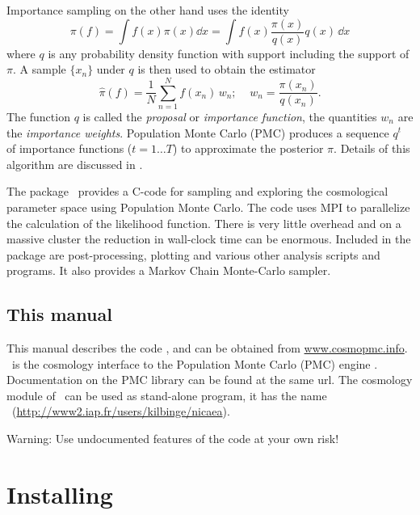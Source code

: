 \documentclass[11pt, chapterprefix, headsepline]{scrartcl}
\begin{document}
Importance sampling on the other
hand uses the identity
%
\begin{equation}
  \pi(f) = \int f(x) \pi(x) \dd x = \int f(x) \frac{\pi(x)}{q(x)} q(x) \,
  \dd x
\end{equation}
%
where $q$ is any probability density function with support including
the support of $\pi$.
A sample $\{x_n\}$ under $q$ is then
used to obtain the estimator
%
\begin{equation}
  \hat \pi (f) = \frac 1 N \sum_{n=1}^N f(x_n) \, w_n; \;\;\;\; w_n =
  \frac{\pi(x_n)}{q(x_n)}.
  \label{eq:importance_weight}
\end{equation}
%
The function $q$ is called the \textit{proposal} or \textit{importance
  function}, the quantities $w_n$ are the \textit{importance weights}.
Population Monte Carlo (PMC)  produces a sequence $q^t$ of importance
functions ($t=1 \ldots T$) to approximate the posterior $\pi$. Details
of this algorithm are discussed in \citet{WK09}.

The package \CosmoPMC\ provides a C-code for sampling and exploring the
cosmological parameter space using Population Monte Carlo. The code
uses MPI to parallelize the
calculation of the likelihood function. There is very little overhead
and on a massive cluster the reduction in wall-clock time can be
enormous. Included in the package are post-processing, plotting and
various other analysis scripts and programs. It also provides a
Markov Chain Monte-Carlo sampler.


\subsection{This manual}

This manual describes the code \CosmoPMC, and can be obtained from
\url{www.cosmopmc.info}. \CosmoPMC\ is the cosmology interface to the
Population Monte Carlo (PMC) engine \pmclib. Documentation on the PMC
library can be found at the same url.
The cosmology module of \CosmoPMC\ can be used as stand-alone program,
it has the name \nicaea\
(\url{http://www2.iap.fr/users/kilbinge/nicaea}).

Warning: Use undocumented features of the code at your own risk!


\section{Installing  \CosmoPMC}
\end{document}
